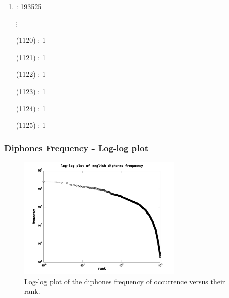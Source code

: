 \documentclass{beamer}
\begin{document}
{\begin{tiny}
\begin{multicols}{4}
\begin{enumerate}
    \item {} : 193525
	\item[] $\vdots$
	\item[(1120)]  : 1
	\item[(1121)]  : 1
	\item[(1122)]  : 1
	\item[(1123)]  : 1
	\item[(1124)]  : 1
	\item[(1125)]  : 1
\end{enumerate}
\end{multicols}
\end{tiny}
}



\frame
{
  \frametitle{Diphones Frequency - Log-log plot}
\begin{figure}[h!]
\centering
\includegraphics[width=0.7\textwidth]{images/diphonesfrequency_en.pdf}
\caption{Log-log plot of the diphones frequency of occurrence versus their rank.}
\label{fig:diphonesfrequency_en}
\end{figure} 
}
\end{document}
